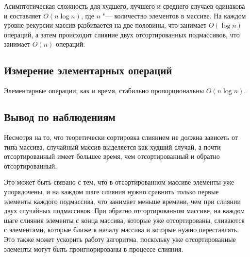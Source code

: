 \documentclass[11pt]{article}
\begin{document}
\begin{center}
\end{center}
{ \hspace*{\fill} }

\begin{center}
\end{center}
{ \hspace*{\fill} }

Асимптотическая сложность для худшего, лучшего и среднего случаев одинакова и составляет $O(n\log n)$,
где $n$ "--- количество элементов в массиве. На каждом уровне рекурсии массив разбивается на две половины,
что занимает $O(\log n)$ операций, а затем происходит слияние двух отсортированных подмассивов, что занимает $O(n)$ операций.

\subsection{Измерение элементарных операций}

\begin{center}
\end{center}
{ \hspace*{\fill} }

\begin{center}
\end{center}
{ \hspace*{\fill} }

Элементарные операции, как и время, стабильно пропорциональны $O(n\log n)$.

\subsection{Вывод по наблюдениям}

Несмотря на то, что теоретически сортировка слиянием не должна зависеть от типа массива,
случайный массив выделяется как худший случай, а почти отсортированный имеет большее время, чем отсортированный и обратно отсортированный.

Это может быть связано с тем, что в отсортированном массиве элементы уже упорядочены, и на каждом шаге слияния нужно сравнить только первые элементы
каждого подмассива, что занимает меньше времени, чем при слиянии двух случайных подмассивов. При обратно отсортированном массиве, на каждом шаге слияния элементы с
конца массива, которые уже отсортированы, сливаются с элементами, которые ближе к началу массива и которые нужно переставлять.
Это также может ускорить работу алгоритма, поскольку уже отсортированные элементы могут быть проигнорированы в процессе слияния.
\end{document}
